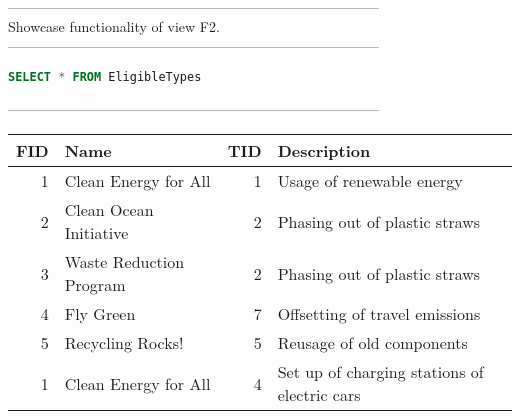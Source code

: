 --------------------------------------------------------------------------------
\\Showcase functionality of view F2.\\
--------------------------------------------------------------------------------
\begin{lstlisting}[language = SQL]
SELECT * FROM EligibleTypes
\end{lstlisting}
--------------------------------------------------------------------------------
\\\begin{tabular}{rlrl}
\toprule
   FID & Name                    &   TID & Description                                  \\
\midrule
     1 & Clean Energy for All    &     1 & Usage of renewable energy                    \\
     2 & Clean Ocean Initiative  &     2 & Phasing out of plastic straws                \\
     3 & Waste Reduction Program &     2 & Phasing out of plastic straws                \\
     4 & Fly Green               &     7 & Offsetting of travel emissions               \\
     5 & Recycling Rocks!        &     5 & Reusage of old components                    \\
     1 & Clean Energy for All    &     4 & Set up of charging stations of electric cars \\
\bottomrule
\end{tabular}